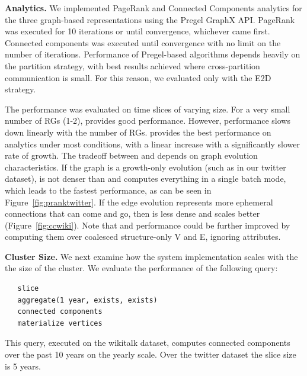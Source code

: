 {\bf Analytics.}  We implemented PageRank and Connected Components
analytics for the three graph-based representations using the Pregel
GraphX API.  PageRank was executed for 10 iterations or until
convergence, whichever came first.  Connected components was executed
until convergence with no limit on the number of iterations.
Performance of Pregel-based algorithms depends heavily on the
partition strategy, with best results achieved where cross-partition
communication is small.  For this reason, we evaluated only with the
E2D strategy.  

The performance was evaluated on time slices of varying size.  For a
very small number of RGs (1-2), \sg provides good performance.
However, \sg performance slows down linearly with the number of RGs.
\hg provides the best performance on analytics under most conditions,
with a linear increase with a significantly slower rate of growth.
The tradeoff between \og and \hg depends on graph evolution
characteristics.  If the graph is a growth-only evolution (such as in
our twitter dataset), \og is not denser than \hg and computes
everything in a single batch mode, which leads to the fastest
performance, as can be seen in Figure~\ref{fig:pranktwitter}.  If the
edge evolution represents more ephemeral connections that can come and
go, then \hg is less dense and scales better
(Figure~\ref{fig:ccwiki}).  Note that \og and \hg performance could be
further improved by computing them over coalesced structure-only V and
E, ignoring attributes.

{\bf Cluster Size.}  We next examine how the system implementation
scales with the the size of the cluster.  We evaluate the performance
of the following query:

\begin{small}
\begin{verbatim}
   slice
   aggregate(1 year, exists, exists)
   connected components
   materialize vertices
\end{verbatim}
\end{small}

This query, executed on the wikitalk dataset, computes connected
components over the past 10 years on the yearly scale.  Over the
twitter dataset the slice size is 5 years.


